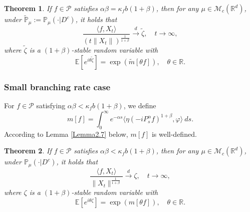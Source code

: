 \documentclass[12pt,a4paper]{amsart}
\theoremstyle{plain}
\newtheorem{thm}{Theorem}[section]
\theoremstyle{definition}
\numberwithin{equation}{section}
\begin{document}
\begin{thm}
\label{Theorem12}
    If $f\in\mathcal{P}$ satisfies  $\alpha\beta=\kappa_fb(1+\beta)$,
   then for any $\mu\in \mathcal M_c(\mathbb R^d)$, under
    $\tilde{\mathbb P}_\mu := \mathbb{P}_{\mu}(\cdot|D^c)$, it holds that
\[
    \frac{\langle f,X_t\rangle}{\left(t\|X_t\|\right)^{\frac{1}{1+\beta}}}
    \xrightarrow{d} \tilde{\zeta},
    \quad t\rightarrow \infty,
\]
    where $\tilde{\zeta}$ is a $(1+\beta)$-stable random variable with
\[
    \mathbb{E} [e^{i\theta \tilde{\zeta}}]
    =\exp(\widetilde{m}[\theta f]),
   \quad \theta\in \mathbb R.
\]
\end{thm}

\subsubsection{Small branching rate case}

For $f\in \mathcal{P}$ satisfying $\alpha\beta<\kappa_f b(1+\beta)$, we define
\begin{equation}
     m[f]
    =\int_0^{\infty} e^{-\alpha s} \langle \eta (-iP_s^\alpha f)^{1+\beta}, \varphi \rangle~ds. \label{msmallcase}
\end{equation}
According to Lemma \ref{Lemma2.7} below, $m[f]$ is well-defined.
\begin{thm}
\label{Theorem13}
    If $f\in\mathcal{P}$ satisfies  $\alpha\beta<\kappa_f b(1+\beta)$,
   then for any $\mu\in \mathcal M_c(\mathbb R^d)$, under
    $\mathbb{P}_{\mu}(\cdot|D^c)$, it holds that
    $$\frac{\langle f,X_t\rangle}{\|X_t\|^{\frac{1}{1+\beta}}}\xrightarrow{d} \zeta, \quad t\rightarrow \infty,$$
    where $\zeta$ is a $(1+\beta)$-stable random variable with
    $$\mathbb{E} [e^{i\theta \zeta}]=\exp(m[\theta f]), \quad \theta\in \mathbb R.$$
\end{thm}
\end{document}
